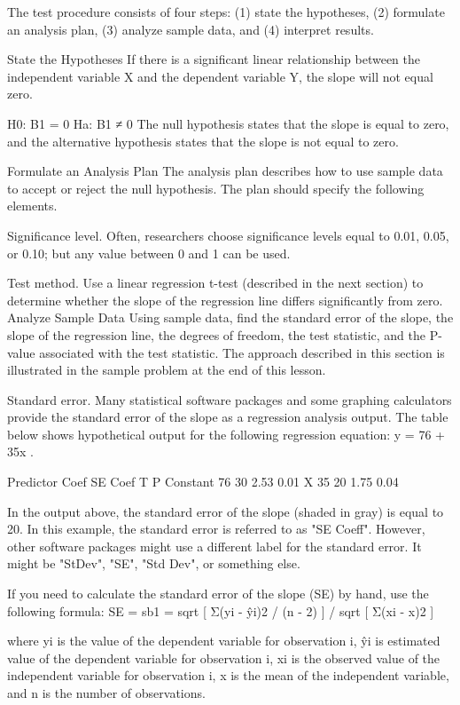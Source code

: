 \documentclass[a4paper,12pt]{article}
\begin{document}
The test procedure consists of four steps: (1) state the hypotheses, (2) formulate an analysis plan, (3) analyze sample data, and (4) interpret results.

State the Hypotheses
If there is a significant linear relationship between the independent variable X and the dependent variable Y, the slope will not equal zero.

H0: Β1 = 0 
Ha: Β1 ≠ 0
The null hypothesis states that the slope is equal to zero, and the alternative hypothesis states that the slope is not equal to zero.

Formulate an Analysis Plan
The analysis plan describes how to use sample data to accept or reject the null hypothesis. The plan should specify the following elements.

Significance level. Often, researchers choose significance levels equal to 0.01, 0.05, or 0.10; but any value between 0 and 1 can be used.

Test method. Use a linear regression t-test (described in the next section) to determine whether the slope of the regression line differs significantly from zero.
Analyze Sample Data
Using sample data, find the standard error of the slope, the slope of the regression line, the degrees of freedom, the test statistic, and the P-value associated with the test statistic. The approach described in this section is illustrated in the sample problem at the end of this lesson.

Standard error. Many statistical software packages and some graphing calculators provide the standard error of the slope as a regression analysis output. The table below shows hypothetical output for the following regression equation: y = 76 + 35x .

Predictor	Coef	SE Coef	T	P
Constant	76	30	2.53	0.01
X	35	20	1.75	0.04

In the output above, the standard error of the slope (shaded in gray) is equal to 20. In this example, the standard error is referred to as "SE Coeff". However, other software packages might use a different label for the standard error. It might be "StDev", "SE", "Std Dev", or something else. 

If you need to calculate the standard error of the slope (SE) by hand, use the following formula:
SE = sb1 = sqrt [ Σ(yi - ŷi)2 / (n - 2) ] / sqrt [ Σ(xi - x)2 ]

where yi is the value of the dependent variable for observation i, ŷi is estimated value of the dependent variable for observation i, xi is the observed value of the independent variable for observation i, x is the mean of the independent variable, and n is the number of observations.
\end{document}
